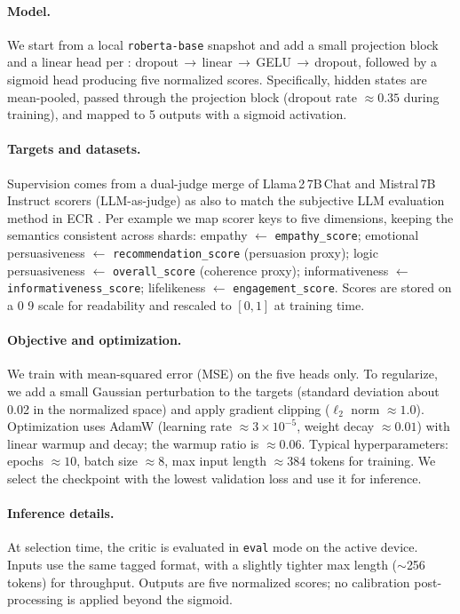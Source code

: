 \documentclass[12pt]{article}
\begin{document}
  \paragraph{Model.} We start from a local \texttt{roberta-base} snapshot and add a small projection block and a linear head per \citep{devlin2018bert,vaswani2017attention}: dropout\,\(\to\)\,linear\,\(\to\)\,GELU\,\(\to\)\,dropout, followed by a sigmoid head producing five normalized scores. Specifically, hidden states are mean-pooled, passed through the projection block (dropout rate \(\approx 0.35\) during training), and mapped to 5 outputs with a sigmoid activation.
  
  \paragraph{Targets and datasets.} Supervision comes from a dual-judge merge of Llama\,2\,7B\,Chat and Mistral\,7B\,Instruct scorers (LLM-as-judge) \citep{yan2023llmjudge} as also to match the subjective LLM evaluation method in ECR \citep{zhang2024ecr}. Per example we map scorer keys to five dimensions, keeping the semantics consistent across shards: empathy \(\leftarrow\) \texttt{empathy\_score}; emotional persuasiveness \(\leftarrow\) \texttt{recommendation\_score} (persuasion proxy); logic persuasiveness \(\leftarrow\) \texttt{overall\_score} (coherence proxy); informativeness \(\leftarrow\) \texttt{informativeness\_score}; lifelikeness \(\leftarrow\) \texttt{engagement\_score}. Scores are stored on a 0\,\textendash\,9 scale for readability and rescaled to \([0,1]\) at training time.
  
  \paragraph{Objective and optimization.} We train with mean-squared error (MSE) on the five heads only. To regularize, we add a small Gaussian perturbation to the targets (standard deviation about 0.02 in the normalized space) and apply gradient clipping (\(\ell_2\) norm \(\approx 1.0\)). Optimization uses AdamW (learning rate \(\approx 3\times 10^{-5}\), weight decay \(\approx 0.01\)) with linear warmup and decay; the warmup ratio is \(\approx 0.06\). Typical hyperparameters: epochs \(\approx 10\), batch size \(\approx 8\), max input length \(\approx 384\) tokens for training. We select the checkpoint with the lowest validation loss and use it for inference.
  
  \paragraph{Inference details.} At selection time, the critic is evaluated in \texttt{eval} mode on the active device. Inputs use the same tagged format, with a slightly tighter max length (\(\sim\)256 tokens) for throughput. Outputs are five normalized scores; no calibration post-processing is applied beyond the sigmoid.
\end{document}
